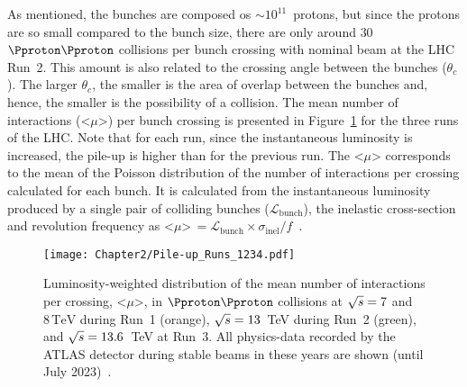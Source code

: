 As mentioned, the bunches are composed os $\sim10^{11}$~protons, but since the 
protons are so small compared to the bunch size, there are only around 
$30$ $\Pproton \Pproton$ collisions per bunch crossing with nominal beam at the LHC Run~2. 
This amount is also related to the crossing angle between the bunches ($\theta_{c}$).
The larger $\theta_{c}$, the smaller is the area of overlap between the bunches and, hence,
the smaller is the possibility of a collision.
The mean number of interactions (<$\mu$>)
per bunch crossing is presented in Figure~\ref{fig:Chap2:LHC:PileUp_15-18} for the three
runs of the LHC. Note that for each run, since the instantaneous luminosity is increased, 
the pile-up is higher than for the previous run. %
The <$\mu$>
corresponds to the mean of the Poisson distribution of the number of interactions per crossing 
calculated for each bunch. It is calculated from the instantaneous luminosity produced by a single 
pair of colliding bunches ($\mathcal{L}_{\text{bunch}}$),
the inelastic cross-section 
and revolution frequency as 
<$\mu$>$\,= \mathcal{L}_{\text{bunch}} \times \sigma_{\text{inel}} / f$~\cite{ATLAS:2022hro}. %


\begin{figure}
	\centering
 	 \texttt{[image: Chapter2/Pile-up\_Runs\_1234.pdf]}
	 \caption{Luminosity-weighted distribution of the mean number of interactions 
	 per crossing, <$\mu$>, in $\Pproton \Pproton$ collisions at $\sqrt{s}=7$ and $8\,\text{TeV}$ during Run~1 (orange),
	 $\sqrt{s}=13$~TeV during Run~2 (green), and $\sqrt{s}=13.6$~TeV at Run~3.
	 All physics-data recorded by the ATLAS detector during stable beams in these years are shown (until July 2023)~\cite{ATL-DAPR-PUB-2023-001}.}
	\label{fig:Chap2:LHC:PileUp_15-18}
\end{figure}

